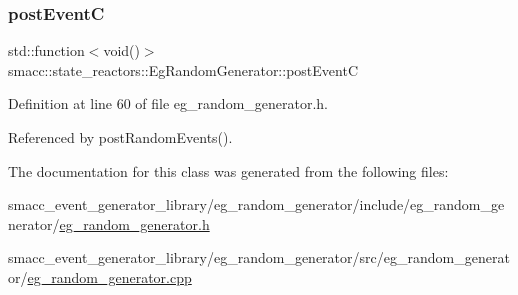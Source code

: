 \subsubsection{\texorpdfstring{post\+EventC}{postEventC}}
{\footnotesize\ttfamily std\+::function$<$void()$>$ smacc\+::state\+\_\+reactors\+::\+Eg\+Random\+Generator\+::post\+EventC\hspace{0.3cm}{\ttfamily [private]}}



Definition at line 60 of file eg\+\_\+random\+\_\+generator.\+h.



Referenced by post\+Random\+Events().



The documentation for this class was generated from the following files\+:\begin{DoxyCompactItemize}
\item 
smacc\+\_\+event\+\_\+generator\+\_\+library/eg\+\_\+random\+\_\+generator/include/eg\+\_\+random\+\_\+generator/\hyperlink{eg__random__generator_8h}{eg\+\_\+random\+\_\+generator.\+h}\item 
smacc\+\_\+event\+\_\+generator\+\_\+library/eg\+\_\+random\+\_\+generator/src/eg\+\_\+random\+\_\+generator/\hyperlink{eg__random__generator_8cpp}{eg\+\_\+random\+\_\+generator.\+cpp}\end{DoxyCompactItemize}
